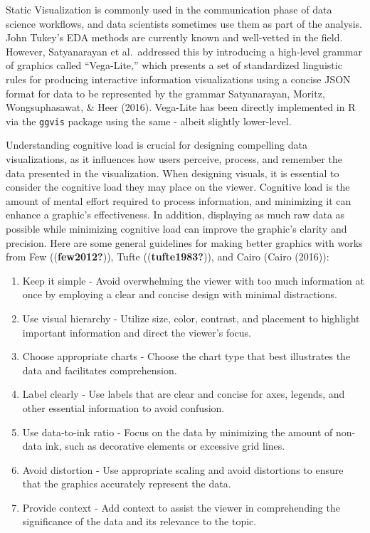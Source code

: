 \documentclass[print]{nuthesis}
\begin{document}
Static Visualization is commonly used in the communication phase of data science workflows, and data scientists sometimes use them as part of the analysis.
John Tukey's EDA methods are currently known and well-vetted in the field.
However, Satyanarayan et al.~addressed this by introducing a high-level grammar of graphics called ``Vega-Lite,'' which presents a set of standardized linguistic rules for producing interactive information visualizations using a concise JSON format for data to be represented by the grammar Satyanarayan, Moritz, Wongsuphasawat, \& Heer (2016).
Vega-Lite has been directly implemented in R via the \texttt{ggvis} package using the same - albeit slightly lower-level.

Understanding cognitive load is crucial for designing compelling data visualizations, as it influences how users perceive, process, and remember the data presented in the visualization.
When designing visuals, it is essential to consider the cognitive load they may place on the viewer.
Cognitive load is the amount of mental effort required to process information, and minimizing it can enhance a graphic's effectiveness.
In addition, displaying as much raw data as possible while minimizing cognitive load can improve the graphic's clarity and precision.
Here are some general guidelines for making better graphics with works from Few ((\textbf{few2012?})), Tufte ((\textbf{tufte1983?})), and Cairo (Cairo (2016)):

\begin{enumerate}
\def\labelenumi{\arabic{enumi}.}
\item
  Keep it simple - Avoid overwhelming the viewer with too much information at once by employing a clear and concise design with minimal distractions.
\item
  Use visual hierarchy - Utilize size, color, contrast, and placement to highlight important information and direct the viewer's focus.
\item
  Choose appropriate charts - Choose the chart type that best illustrates the data and facilitates comprehension.
\item
  Label clearly - Use labels that are clear and concise for axes, legends, and other essential information to avoid confusion.
\item
  Use data-to-ink ratio - Focus on the data by minimizing the amount of non-data ink, such as decorative elements or excessive grid lines.
\item
  Avoid distortion - Use appropriate scaling and avoid distortions to ensure that the graphics accurately represent the data.
\item
  Provide context - Add context to assist the viewer in comprehending the significance of the data and its relevance to the topic.
\end{enumerate}
\end{document}
